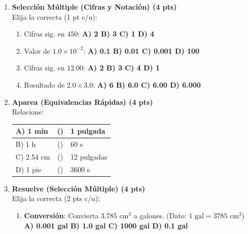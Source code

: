 \documentclass[a4paper,12pt]{article}
\begin{document}
\begin{enumerate}[label=\textbf{Item \arabic*:}, leftmargin=*]
    \item \textbf{Selección Múltiple (Cifras y Notación) (4 pts)} \\
    Elija la correcta (1 pt c/u):
    \begin{enumerate}[label=\roman*)]
        \item Cifras sig. en $450$: \textbf{A) 2 \quad B) 3 \quad C) 1 \quad D) 4}
        \item Valor de $1.0 \times 10^{-2}$: \textbf{A) 0.1 \quad B) 0.01 \quad C) 0.001 \quad D) 100}
        \item Cifras sig. en $12.00$: \textbf{A) 2 \quad B) 3 \quad C) 4 \quad D) 1}
        \item Resultado de $2.0 \times 3.0$: \textbf{A) 6 \quad B) 6.0 \quad C) 6.00 \quad D) 6.000}
    \end{enumerate}

    \item \textbf{Aparea (Equivalencias Rápidas) (4 pts)} \\
    Relacione:
    \begin{center}
    \begin{tabular}{|l|c|l|}
        \hline
        A) 1 min & (\hspace{0.5cm}) & 1 pulgada \\ \hline
        B) 1 h & (\hspace{0.5cm}) & 60 s \\ \hline
        C) 2.54 cm & (\hspace{0.5cm}) & 12 pulgadas \\ \hline
        D) 1 pie & (\hspace{0.5cm}) & 3600 s \\ \hline
    \end{tabular}
    \end{center}

    \item \textbf{Resuelve (Selección Múltiple) (4 pts)} \\
    Elija la correcta (2 pts c/u):
    \begin{enumerate}[label=\Alph*)]
        \item \textbf{Conversión}: Convierta $3.785 \text{ cm}^3$ a galones. (Dato: $1 \text{ gal} = 3785 \text{ cm}^3$) \\
        \textbf{A) 0.001 gal \quad B) 1.0 gal \quad C) 1000 gal \quad D) 0.1 gal}
        

\end{enumerate}
\end{enumerate}
\end{document}

